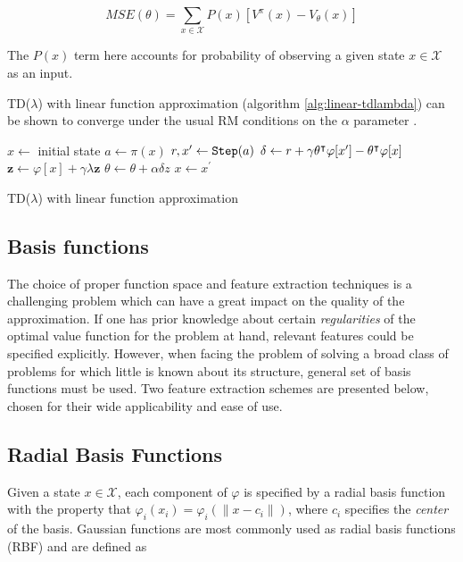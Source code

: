 \begin{equation}
MSE(\theta) = \sum_{ x \in \mathcal{X}} P(x) \left[ V^\pi(x) - V_\theta(x) \right]
\end{equation}

The $P(x)$ term here accounts for probability of observing a given state $x \in \mathcal{X}$ as an input.

TD($\lambda$) with linear function approximation (algorithm \ref{alg:linear-tdlambda}) can be shown to converge under the usual RM conditions on the $\alpha$ parameter \parencite{Tsitsiklis1997}.

\begin{algorithm}
\DontPrintSemicolon
{}
$x \leftarrow$ initial state\;
 {
$a \leftarrow \pi(x)$\;
$r, x^\prime \leftarrow \FuncSty{Step}(a)$\;
$\delta \leftarrow r + \gamma \theta^\intercal \varphi[x^\prime] -
\theta^\intercal \varphi[x]$\;
$\mathbf{z} \leftarrow \varphi[x] + \gamma \lambda \mathbf{z}$ \;
$\theta \leftarrow \theta + \alpha \delta z$\;
$x \leftarrow x^\prime$
}
\caption{TD($\lambda$) with linear function approximation}
\label{alg:linear-tdlambda}
\end{algorithm}

\subsection{Basis functions}

The choice of proper function space and feature extraction techniques is a challenging problem which can have a great impact on the quality of the approximation. If one has prior knowledge about certain \textit{regularities} of the optimal value function for the problem at hand, relevant features could be
specified explicitly. However, when facing the problem of solving a broad class of
problems for which little is known about its structure, general set of basis functions
must be used. Two feature extraction schemes are presented below, chosen for their wide
applicability and ease of use. 

\subsection{Radial Basis Functions}

Given a state $x \in \mathcal{X}$, each component of $\varphi$ is specified by a radial basis function with the property that $\varphi_i(x_i) = \varphi_i(\|x - c_i\|)$, where $c_i$ specifies the \textit{center} of the basis. Gaussian functions are most commonly used as radial basis functions (RBF) and are defined as

